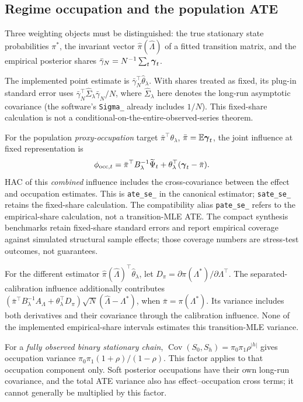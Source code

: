 \subsection{Regime occupation and the population ATE}
\label{app:proof_prop6}
Three weighting objects must be distinguished: the true stationary state probabilities $\pi^*$, the invariant vector $\hat\pi(\hat\Lambda)$ of a fitted transition matrix, and the empirical posterior shares $\bar\gamma_N=N^{-1}\sum_t\boldsymbol{\gamma}_t$.

The implemented point estimate is $\bar\gamma_N^\top\hat\theta_\lambda$. With shares treated as fixed, its plug-in standard error uses $\bar\gamma_N^\top\hat\Sigma_\lambda\bar\gamma_N/N$, where $\hat\Sigma_\lambda$ here denotes the long-run asymptotic covariance (the software's \texttt{Sigma\_} already includes $1/N$). This fixed-share calculation is not a conditional-on-the-entire-observed-series theorem.

For the population \emph{proxy-occupation} target $\bar\pi^\top\theta_\lambda$, $\bar\pi=\mathbb{E}\boldsymbol{\gamma}_t$, the joint influence at fixed representation is
\[
\phi_{{\rm occ},t}=\bar\pi^\top B_\lambda^{-1}\widetilde\Psi_t
+\theta_\lambda^\top(\boldsymbol{\gamma}_t-\bar\pi).
\]
HAC of this \emph{combined} influence includes the cross-covariance between the effect and occupation estimates. This is \texttt{ate\_se\_} in the canonical estimator; \texttt{sate\_se\_} retains the fixed-share calculation. The compatibility alias \texttt{pate\_se\_} refers to the empirical-share calculation, not a transition-MLE ATE. The compact synthesis benchmarks retain fixed-share standard errors and report empirical coverage against simulated structural sample effects; those coverage numbers are stress-test outcomes, not guarantees.

For the different estimator $\hat\pi(\hat\Lambda)^\top\hat\theta_\lambda$, let $D_\pi=\partial\pi(\Lambda^*)/\partial\Lambda^\top$. The separated-calibration influence additionally contributes $(\bar\pi^\top B_\lambda^{-1}A_\Lambda+\theta_\lambda^\top D_\pi)\sqrt N(\hat\Lambda-\Lambda^*)$, when $\bar\pi=\pi(\Lambda^*)$. Its variance includes both derivatives and their covariance through the calibration influence. None of the implemented empirical-share intervals estimates this transition-MLE variance.

For a \emph{fully observed binary stationary chain}, $\operatorname{Cov}(S_0,S_h)=\pi_0\pi_1\rho^{|h|}$ gives occupation variance $\pi_0\pi_1(1+\rho)/(1-\rho)$. This factor applies to that occupation component only. Soft posterior occupations have their own long-run covariance, and the total ATE variance also has effect--occupation cross terms; it cannot generally be multiplied by this factor.

